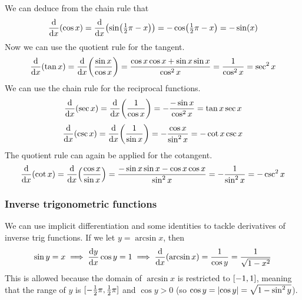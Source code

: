 We can deduce from the chain rule that
\begin{equation*}
\dv{x}(\cos x) = \dv{x}(\sin(\tfrac 12 \pi - x))
    = -\cos(\tfrac 12 \pi - x) = -\sin(x)
\end{equation*}
Now we can use the quotient rule for the tangent.
\begin{equation*}
\dv{x}(\tan x) = \dv{x}(\frac{\sin x}{\cos x})
    = \frac{\cos x \cos x + \sin x \sin x}{\cos^2 x}
    = \frac 1{\cos^2 x} = \sec^2 x
\end{equation*}
We can use the chain rule for the reciprocal functions.
\begin{equation*}
\dv{x}(\sec x) = \dv{x}(\frac 1{\cos x}) = -\frac{-\sin x}{\cos^2 x}
    = \tan x \sec x
\end{equation*}
\begin{equation*}
\dv{x}(\csc x) = \dv{x}(\frac 1{\sin x}) = -\frac{\cos x}{\sin^2 x}
    = -\cot x \csc x
\end{equation*}
The quotient rule can again be applied for the cotangent.
\begin{equation*}
\dv{x}(\cot x) = \dv{x}(\frac{\cos x}{\sin x})
    = \frac{-\sin x \sin x - \cos x \cos x}{\sin^2 x}
    = -\frac 1{\sin^2 x} = -\csc^2 x
\end{equation*}

\subsubsection{Inverse trigonometric functions} \label{sec_calc_trig_inv}

We can use implicit differentiation and some identities to tackle
derivatives of inverse trig functions. If we let \(y = \arcsin x\), then
\begin{equation*}
\sin y = x \implies \dv{y}{x} \cos y = 1
    \implies \dv{x}(\arcsin x) = \frac 1{\cos y} = \frac 1{\sqrt{1 - x^2}}
\end{equation*}
This is allowed because the domain of \(\arcsin x\) is restricted to
\([-1, 1]\), meaning that the range of \(y\) is
\([-\frac 12 \pi, \frac 12 \pi]\) and \(\cos y > 0\)
(so \(\cos y = \lvert\cos y\rvert = \sqrt{1 - \sin^2 y}\)).

